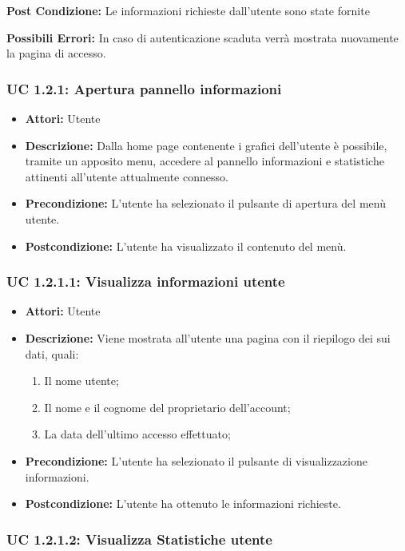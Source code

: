\textbf{Post Condizione:}
Le informazioni richieste dall'utente sono state fornite

\textbf{Possibili Errori:}
In caso di autenticazione scaduta verrà mostrata nuovamente la pagina di accesso.

\subsubsection{UC 1.2.1: Apertura pannello informazioni}

\begin{itemize}
\item \textbf{Attori:} Utente
\item \textbf{Descrizione:} Dalla home page contenente i grafici dell'utente è possibile, tramite un apposito menu, accedere al pannello informazioni e statistiche attinenti all'utente attualmente connesso.
\item \textbf{Precondizione:} L'utente ha selezionato il pulsante di apertura del menù utente.
\item \textbf{Postcondizione:} L'utente ha visualizzato il contenuto del menù.
\end{itemize}

\subsubsection{UC 1.2.1.1: Visualizza informazioni utente}

\begin{itemize}
\item \textbf{Attori:} Utente
\item \textbf{Descrizione:} Viene mostrata all'utente una pagina con il riepilogo dei sui dati, quali:
\begin{enumerate}
\item Il nome utente;
\item Il nome e il cognome del proprietario dell'account;
\item La data dell'ultimo accesso effettuato;
\end{enumerate}
\item \textbf{Precondizione:} L'utente ha selezionato il pulsante di visualizzazione informazioni.
\item \textbf{Postcondizione:} L'utente ha ottenuto le informazioni richieste.
\end{itemize}

\subsubsection{UC 1.2.1.2: Visualizza Statistiche utente}

